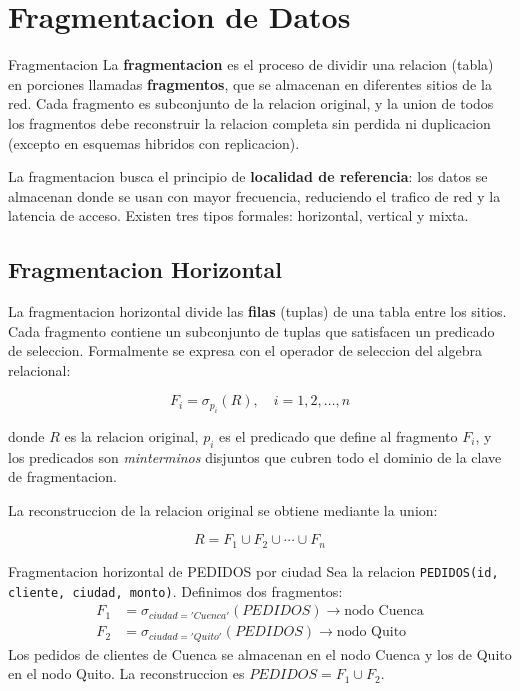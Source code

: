\documentclass[11pt,a4paper]{article}
\begin{document}
\section{Fragmentacion de Datos}

\begin{defbox}{Fragmentacion}
La \textbf{fragmentacion} es el proceso de dividir una relacion (tabla) en porciones llamadas \textbf{fragmentos}, que se almacenan en diferentes sitios de la red. Cada fragmento es subconjunto de la relacion original, y la union de todos los fragmentos debe reconstruir la relacion completa sin perdida ni duplicacion (excepto en esquemas hibridos con replicacion).
\end{defbox}

La fragmentacion busca el principio de \textbf{localidad de referencia}: los datos se almacenan donde se usan con mayor frecuencia, reduciendo el trafico de red y la latencia de acceso. Existen tres tipos formales: horizontal, vertical y mixta.

\subsection{Fragmentacion Horizontal}

La fragmentacion horizontal divide las \textbf{filas} (tuplas) de una tabla entre los sitios. Cada fragmento contiene un subconjunto de tuplas que satisfacen un predicado de seleccion. Formalmente se expresa con el operador de seleccion del algebra relacional:

\begin{equation}
F_i = \sigma_{p_i}(R), \quad i = 1, 2, \ldots, n
\end{equation}

donde $R$ es la relacion original, $p_i$ es el predicado que define al fragmento $F_i$, y los predicados son \textit{minterminos} disjuntos que cubren todo el dominio de la clave de fragmentacion.

La reconstruccion de la relacion original se obtiene mediante la union:

\begin{equation}
R = F_1 \cup F_2 \cup \cdots \cup F_n
\end{equation}

\begin{examplebox}{Fragmentacion horizontal de PEDIDOS por ciudad}
Sea la relacion \texttt{PEDIDOS(id, cliente, ciudad, monto)}. Definimos dos fragmentos:
\begin{align}
F_1 &= \sigma_{ciudad = 'Cuenca'}(PEDIDOS) \rightarrow \text{nodo Cuenca}\\
F_2 &= \sigma_{ciudad = 'Quito'}(PEDIDOS) \rightarrow \text{nodo Quito}
\end{align}
Los pedidos de clientes de Cuenca se almacenan en el nodo Cuenca y los de Quito en el nodo Quito. La reconstruccion es $PEDIDOS = F_1 \cup F_2$.
\end{examplebox}
\end{document}
